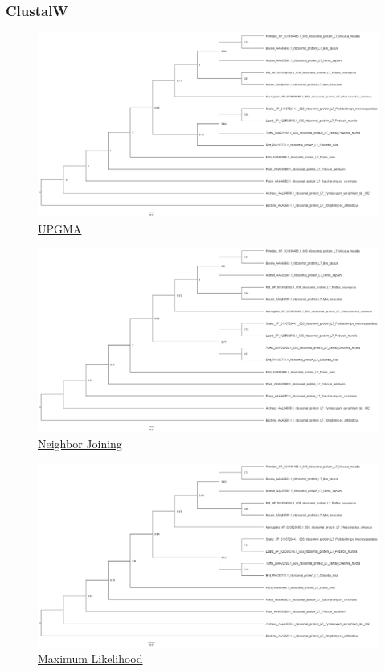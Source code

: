 \subsubsection*{ClustalW}
\begin{figure}[!h]
	\includegraphics[width=1\linewidth]{Tree_ClustalW/RL7_ClustalW_UPGMA.png}
	\caption{\href{https://drive.google.com/file/d/1hPpDUa9uJmDLcnrepNsUhFL9HPq9cWZD/view?usp=sharing}{UPGMA}}
\end{figure}
\newpage
\begin{figure}[!h]
	\includegraphics[width=1\linewidth]{Tree_ClustalW/RL7_ClustalW_NJ.png}
	\caption{\href{https://drive.google.com/file/d/1fIEN3s1rEiak2htmVUBiG3kB9EShOhEs/view?usp=sharing}{Neighbor Joining}}
\end{figure}
\begin{figure}[!h]
	\includegraphics[width=1\linewidth]{Tree_ClustalW/RL7_ClustalW_ML.png}
	\caption{\href{https://drive.google.com/file/d/1OAH_Js0PMo2zVixTMYlEwZyR-ohE5Rn8/view?usp=sharing}{Maximum Likelihood}}
\end{figure}
\newpage
